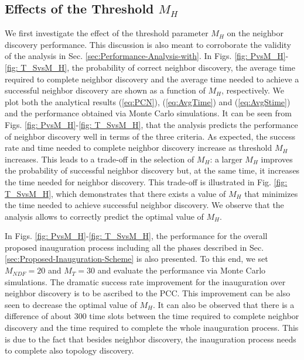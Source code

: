 \documentclass[10pt,english,two column]{IEEEtran}
\begin{document}
\subsection{Effects of the Threshold $M_{H}$}

We first investigate the effect of the threshold parameter $M_{H}$
on the neighbor discovery performance. This discussion is also meant
to corroborate the validity of the analysis in Sec. \ref{sec:Performance-Analysis-with}.
In Figs. \ref{fig: PvsM_H}-\ref{fig: T_SvsM_H}, the probability
of correct neighbor discovery, the average time required to complete
neighbor discovery and the average time needed to achieve a successful
neighbor discovery are shown as a function of $M_{H}$, respectively.
We plot both the analytical results (\ref{eq:PCN}), (\ref{eq:AvgTime})
and (\ref{eq:AvgStime}) and the performance obtained via Monte Carlo
simulations. It can be seen from Figs. \ref{fig: PvsM_H}-\ref{fig: T_SvsM_H},
that the analysis predicts the performance of neighbor discovery well
in terms of the three criteria. As expected, the success rate and
time needed to complete neighbor discovery increase as threshold $M_{H}$
increases. This leads to a trade-off in the selection of $M_{H}$:
a larger $M_{H}$ improves the probability of successful neighbor
discovery but, at the same time, it increases the time needed for
neighbor discovery. This trade-off is illustrated in Fig. \ref{fig: T_SvsM_H},
which demonstrates that there exists a value of $M_{H}$ that minimizes
the time needed to achieve successful neighbor discovery. We observe
that the analysis allows to correctly predict the optimal value of
$M_{H}$. 

In Figs. \ref{fig: PvsM_H}-\ref{fig: T_SvsM_H}, the performance
for the overall proposed inauguration process including all the phases
described in Sec. \ref{sec:Proposed-Inauguration-Scheme} is also
presented. To this end, we set $M_{NDF}=20$ and $M_{T}=30$ and evaluate
the performance via Monte Carlo simulations. The dramatic success
rate improvement for the inauguration over neighbor discovery is to
be ascribed to the PCC. This improvement can be also seen to decrease
the optimal value of $M_{H}$. It can also be observed that there
is a difference of about 300 time slots between the time required
to complete neighbor discovery and the time required to complete the
whole inauguration process. This is due to the fact that besides neighbor
discovery, the inauguration process needs to complete also topology
discovery. 
\end{document}
